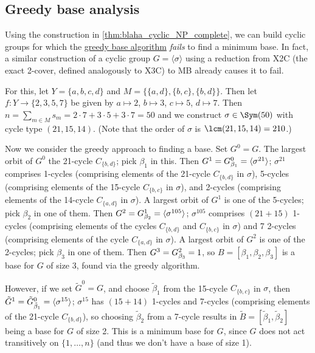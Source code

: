\subsection{Greedy base analysis}

\begin{remark}\label{rem:blaha_cyclic_greedy}
    Using the construction in \autoref{thm:blaha_cyclic_NP_complete}, we can build cyclic groups for which the \hyperref[alg:blaha_greedy_base]{greedy base algorithm} \textit{fails} to find a minimum base. In fact, a similar construction of a cyclic group $G = \langle \sigma \rangle$ using a reduction from X2C (the exact 2-cover, defined analogously to X3C) to MB already causes it to fail.

    For this, let $Y = \{a,b,c,d\}$ and $M = \{\{a,d\},\{b,c\},\{b,d\}\}$. Then let $f : Y \to \{2,3,5,7\}$ be given by $a \mapsto 2$, $b \mapsto 3$, $c \mapsto 5$, $d \mapsto 7$. Then $n = \sum_{m \in M} s_m = 2 \cdot 7 + 3 \cdot 5 + 3 \cdot 7 = 50$ and we construct $\sigma \in \Sym(50)$ with cycle type $(21,15,14)$. (Note that the order of $\sigma$ is $\lcm(21,15,14) = 210$.) 

    Now we consider the greedy approach to finding a base. Set $G^0 = G$. The largest orbit of $G^0$  the 21-cycle $C_{\{b,d\}}$; pick $\beta_1$ in this. Then $G^1 = \added{2}{G^0_{\beta_1}} = \langle \sigma^{21} \rangle$; $\sigma^{21}$ comprises  1-cycles (comprising elements of the 21-cycle $C_{\{b,d\}}$ in $\sigma$),  5-cycles (comprising elements of the 15-cycle $C_{\{b,c\}}$ in $\sigma$), and  2-cycles (comprising elements of the 14-cycle $C_{\{a,d\}}$ in $\sigma$). A largest orbit of $G^1$ is one of the 5-cycles; pick $\beta_2$ in one of them. Then $G^2 = \added{2}{G^1_{\beta_2}} = \langle \sigma^{105} \rangle$; $\sigma^{105}$ comprises $(21 + 15)$ 1-cycles (comprising elements of the cycles $C_{\{b,d\}}$ and $C_{\{b,c\}}$ in $\sigma$) and 7 2-cycles (comprising elements of the cycle $C_{\{a,d\}}$ in $\sigma$). A largest orbit of $G^2$ is one of the 2-cycles; pick $\beta_3$ in one of them. Then $G^3 = \added{2}{G^2_{\beta_3}} = 1$, so $B = [\beta_1,\beta_2,\beta_3]$ is a base for $G$ of size 3, found via the greedy algorithm.

    However, if we set $\tilde G^0 = G$, and choose $\tilde\beta_1$ from the 15-cycle $C_{\{b,c\}}$ in $\sigma$, then $\tilde G^1 = \added{2}{\tilde G^0_{\tilde\beta_1}} = \langle \sigma^{15} \rangle$; $\sigma^{15}$ has $(15 + 14)$ 1-cycles and  7-cycles (comprising elements of the 21-cycle $C_{\{b,d\}}$), so choosing $\tilde\beta_2$ from a 7-cycle results in $\tilde B = [\tilde\beta_1,\tilde\beta_2]$ being a base for $G$ of size 2. This is a minimum base for $G$, since $G$ does not act transitively on $\{1,\dotsc,n\}$ (and thus we don't have a base of size 1).
\end{remark}

